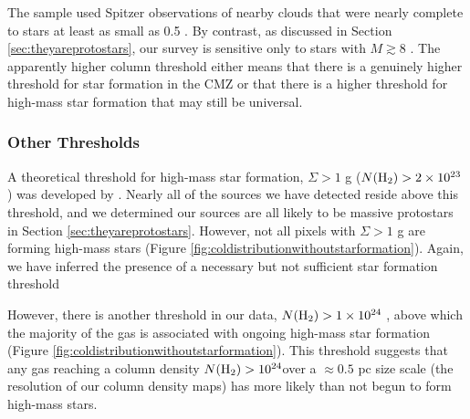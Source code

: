 \documentclass[twocolumn]{aastex61}
\begin{document}
The \citet{Lada2010a} sample used Spitzer observations of nearby clouds that
were nearly complete to stars at least as small as 0.5 \msun.  By contrast, as
discussed in Section \ref{sec:theyareprotostars}, our survey is sensitive only
to stars with $M\gtrsim8$ \msun.  The apparently higher column threshold either
means that there is a genuinely higher threshold for star formation in the CMZ
or that there is a higher threshold for high-mass star formation that may still
be universal.  

\subsubsection{Other Thresholds}

A theoretical threshold for high-mass star formation, $\Sigma > 1$ g \persc ($N(\textrm{H}_{2})
> 2\times10^{23}$ \persc) was developed by \citet{Krumholz2008a}.   Nearly all of the
sources we have detected reside above this threshold, and we determined our
sources are all likely to be massive protostars in Section
\ref{sec:theyareprotostars}.  However, not all pixels with $\Sigma > 1$ g \persc are
forming high-mass stars (Figure \ref{fig:coldistributionwithoutstarformation}).
Again, we have inferred the presence of a necessary but not sufficient star
formation threshold

However, there is another threshold in our data, $N(\textrm{H}_{2})>1\times10^{24}$ \persc,
above which the majority of the gas is associated with ongoing high-mass star
formation (Figure \ref{fig:coldistributionwithoutstarformation}).  This
threshold suggests that any gas reaching a column density
$N(\textrm{H}_{2})>10^{24}$\persc over a $\approx0.5$ pc size scale (the resolution of our
column density maps) has more likely than not begun to form high-mass stars.


\end{document}
